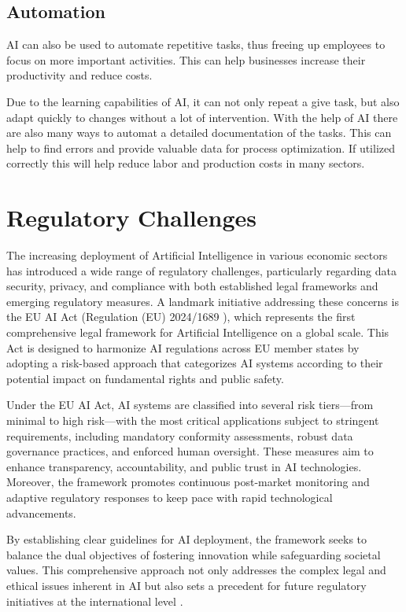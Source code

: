 \subsection{Automation}
\label{subsec:automation}

AI can also be used to automate repetitive tasks, thus freeing up employees to focus on more important activities.
This can help businesses increase their productivity and reduce costs.

Due to the learning capabilities of AI, it can not only repeat a give task, but also adapt quickly to changes without a lot of intervention.
With the help of AI there are also many ways to automat a detailed documentation of the tasks. This can help to find errors and provide valuable data for process optimization. 
If utilized correctly this will help reduce labor and production costs in many sectors. 

\cite{AiAutomation}
\cite{AIAutomation2}

\section{Regulatory Challenges}
\label{sec:regulatory-challanges}

The increasing deployment of Artificial Intelligence in various economic sectors has introduced a wide range of regulatory challenges, particularly regarding data security, privacy, and compliance with both established legal frameworks and emerging regulatory measures. A landmark initiative addressing these concerns is the EU AI Act (Regulation (EU) 2024/1689 \cite{EU-AI-Act-text}), which represents the first comprehensive legal framework for Artificial Intelligence on a global scale. This Act is designed to harmonize AI regulations across EU member states by adopting a risk-based approach that categorizes AI systems according to their potential impact on fundamental rights and public safety.

Under the EU AI Act, AI systems are classified into several risk tiers—from minimal to high risk—with the most critical applications subject to stringent requirements, including mandatory conformity assessments, robust data governance practices, and enforced human oversight. These measures aim to enhance transparency, accountability, and public trust in AI technologies. Moreover, the framework promotes continuous post-market monitoring and adaptive regulatory responses to keep pace with rapid technological advancements.

By establishing clear guidelines for AI deployment, the framework seeks to balance the dual objectives of fostering innovation while safeguarding societal values. This comprehensive approach not only addresses the complex legal and ethical issues inherent in AI but also sets a precedent for future regulatory initiatives at the international level \cite{EURegFrameworkAI}.

